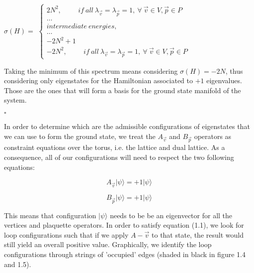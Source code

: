 \documentclass{Configuration_Files/PoliMi3i_thesis}
\begin{document}
\begin{center}
	$\sigma( H) =$
	$\begin{cases}
		2N^2, \hspace{1cm} if \ all\ \lambda_{\vec{v}}= \lambda_{\vec{p}}=1, \  \forall \ \vec{v} \in V , \vec{p} \in P\\
		\dots\\
		intermediate \ energies,\\
		\dots\\
		-2N^2+1\\
		-2N^2, \hspace{1cm} if \ all\ \lambda_{\vec{v}}= \lambda_{\vec{p}}=1, \  \forall \ \vec{v} \in V, \vec{p} \in P
	\end{cases}$
	
\end{center}

Taking the minimum of this spectrum means considering $\sigma(H)=-2N$, thus considering only eigenstates for the Hamiltonian associated to $+1$ eigenvalues.
Those are the ones that will form a basis for the ground state manifold of the system.\newline

\hfill $\square$


In order to determine which are the admissible configurations of eigenstates that we can use to form the ground state, we treat the $A_{\vec{v}} $ and $B_{\vec{p}} $ operators as constraint equations over the torus, i.e. the lattice and dual lattice.
As a consequence, all of our configurations will need to respect the two following equations:

\begin{equation}
	A_{\vec{v}} |\psi\rangle = +1|\psi\rangle
\end{equation}

\begin{equation}
	B_{\vec{p}} |\psi\rangle = +1|\psi\rangle
\end{equation}

This means that configuration $|\psi\rangle$ needs to be be an eigenvector for all the vertices and plaquette operators. \newline
In order to satisfy equation (1.1), we look for loop configurations such that if we apply $A-{\vec{v}} $ to that state, the result would still yield an overall positive value.\newline
Graphically, we identify the loop configurations through strings of 'occupied' edges (shaded in black in figure 1.4 and 1.5).
\end{document}
